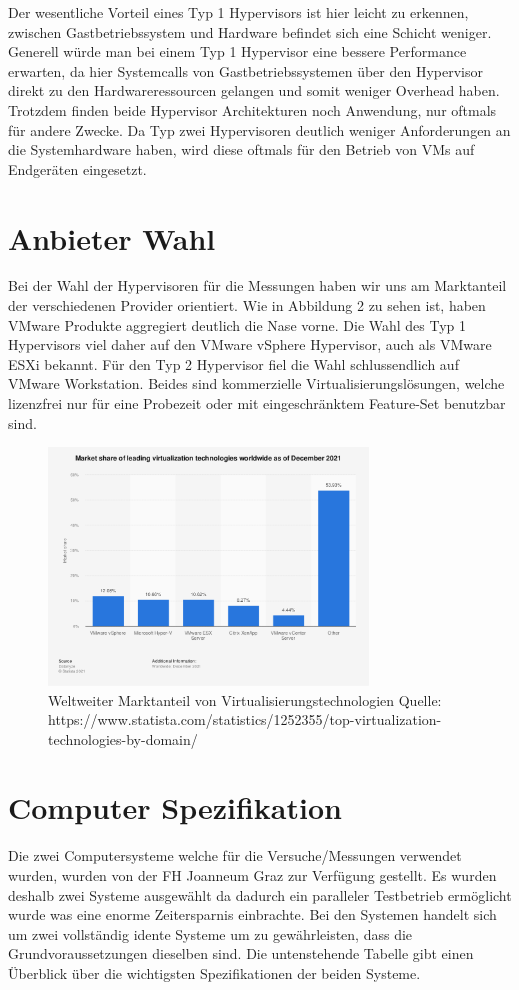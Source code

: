 \documentclass[conference]{IEEEtran}
\begin{document}
Der wesentliche Vorteil eines Typ 1 Hypervisors ist hier leicht zu erkennen, zwischen Gastbetriebssystem und Hardware befindet sich eine Schicht weniger. Generell würde man bei einem Typ 1 Hypervisor eine bessere Performance erwarten, da hier Systemcalls von Gastbetriebssystemen über den Hypervisor direkt zu den Hardwareressourcen gelangen und somit weniger Overhead haben. Trotzdem finden beide Hypervisor Architekturen noch Anwendung, nur oftmals für andere Zwecke. Da Typ zwei Hypervisoren deutlich weniger Anforderungen an die Systemhardware haben, wird diese oftmals für den Betrieb von VMs auf Endgeräten eingesetzt.

\section{Anbieter Wahl}
\label{Anbieter Wahl}
Bei der Wahl der Hypervisoren für die Messungen haben wir uns am Marktanteil der verschiedenen Provider orientiert. Wie in Abbildung 2 zu sehen ist, haben VMware Produkte aggregiert deutlich die Nase vorne. Die Wahl des Typ 1 Hypervisors viel daher auf den VMware vSphere Hypervisor, auch als VMware ESXi bekannt. Für den Typ 2 Hypervisor fiel die Wahl schlussendlich auf VMware Workstation. Beides sind kommerzielle Virtualisierungslösungen, welche lizenzfrei nur für eine Probezeit oder mit eingeschränktem Feature-Set benutzbar sind.

\begin{figure}[h!]
	\centering
	\includegraphics[keepaspectratio,width=8.5cm,height=0.75\textheight]{hypervisor_marketshare.png}
	\caption{Weltweiter Marktanteil von Virtualisierungstechnologien  \linebreak Quelle: https://www.statista.com/statistics/1252355/top-virtualization-technologies-by-domain/}
	\label{marketshare}
\end{figure}

\section{Computer Spezifikation}
\label{Computer Spezifikation}
Die zwei Computersysteme welche für die Versuche/Messungen verwendet wurden, wurden von der FH Joanneum Graz zur Verfügung gestellt. Es wurden deshalb zwei Systeme ausgewählt da dadurch ein paralleler Testbetrieb ermöglicht wurde was eine enorme Zeitersparnis einbrachte. Bei den Systemen handelt sich um zwei vollständig idente Systeme um zu gewährleisten, dass die Grundvoraussetzungen dieselben sind. Die untenstehende Tabelle gibt einen Überblick über die wichtigsten Spezifikationen der beiden Systeme.
\end{document}
